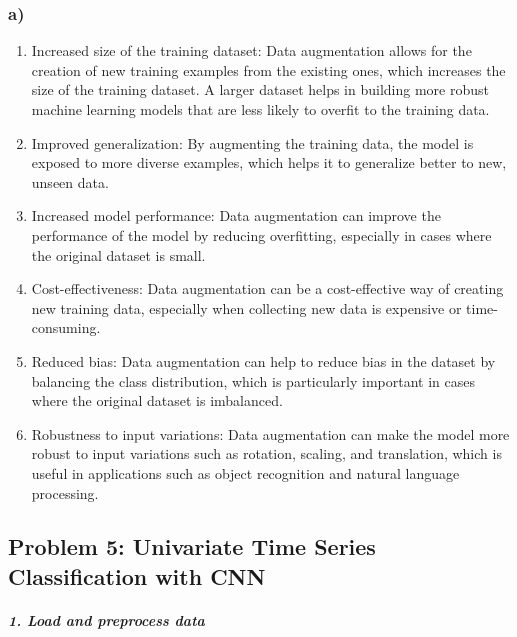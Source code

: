\documentclass[
]{article}
\begin{document}
\hypertarget{a-4}{%
\subsubsection{a)}\label{a-4}}

\begin{enumerate}
\def\labelenumi{\arabic{enumi}.}
\item
  Increased size of the training dataset: Data augmentation allows for
  the creation of new training examples from the existing ones, which
  increases the size of the training dataset. A larger dataset helps in
  building more robust machine learning models that are less likely to
  overfit to the training data.
\item
  Improved generalization: By augmenting the training data, the model is
  exposed to more diverse examples, which helps it to generalize better
  to new, unseen data.
\item
  Increased model performance: Data augmentation can improve the
  performance of the model by reducing overfitting, especially in cases
  where the original dataset is small.
\item
  Cost-effectiveness: Data augmentation can be a cost-effective way of
  creating new training data, especially when collecting new data is
  expensive or time-consuming.
\item
  Reduced bias: Data augmentation can help to reduce bias in the dataset
  by balancing the class distribution, which is particularly important
  in cases where the original dataset is imbalanced.
\item
  Robustness to input variations: Data augmentation can make the model
  more robust to input variations such as rotation, scaling, and
  translation, which is useful in applications such as object
  recognition and natural language processing.
\end{enumerate}

\hypertarget{problem-5-univariate-time-series-classification-with-cnn}{%
\subsection{Problem 5: Univariate Time Series Classification with
CNN}\label{problem-5-univariate-time-series-classification-with-cnn}}

\hypertarget{load-and-preprocess-data-2}{%
\subparagraph{1. Load and preprocess
data}\label{load-and-preprocess-data-2}}
\end{document}
